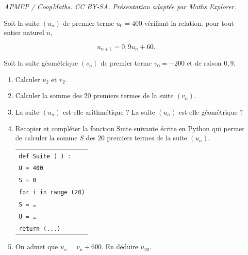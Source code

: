 \documentclass[10pt]{article}
\providecommand{\dotfill}{\ldots}
\begin{document}
\noindent\textit{APMEP / CoopMaths. CC BY-SA. Présentation adaptée par Maths Explorer.}\par\medskip
\medskip

Soit la suite $\left(u_n\right)$ de premier terme $u_0= 400$ vérifiant la relation, pour tout entier naturel $n$,

\[u_{n+1} = 0,9u_n +60.\]

Soit la suite géométrique $\left(v_n\right)$ de premier terme $v_0= - 200$ et de raison $0,9$.

\medskip

\begin{enumerate}
\item Calculer $u_2$ et $v_2$.
\item Calculer la somme des 20 premiers termes de la suite $\left(v_n\right)$.
\item  La suite $\left(u_n\right)$ est-elle arithmétique ? La suite $\left(u_n\right)$ est-elle géométrique ?
\item  Recopier et compléter la fonction Suite suivante écrite en Python qui permet
de calculer la somme $S$ des 20 premiers termes de la suite $\left(u_n\right)$.

\begin{center}
\begin{tabularx}{0.4\linewidth}{|X|}\hline
\texttt{def Suite ( ) :}\\
\quad  \texttt{U = 400}\\
\quad \texttt{S = 0}\\
\quad \texttt{for i in range (20)}\\
\qquad \texttt{S = \dotfill}\\
\qquad \texttt{U = \dotfill}\\
\texttt{return (...)}\\\hline
\end{tabularx}
\end{center}

\item On admet que $u_n= v_n + 600$. En déduire $u_{20}$.
\end{enumerate}

\bigskip
\end{document}
